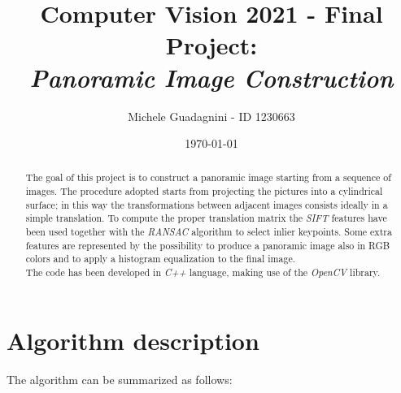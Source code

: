 \documentclass[11pt,a4paper]{article}
\author{Michele Guadagnini - ID 1230663}
\title{\textbf{Computer Vision 2021 - Final Project: \\ \textit{Panoramic Image Construction}}}
\date{\today}
\begin{document}
\maketitle

\vspace{20pt}
\begin{abstract}
	The goal of this project is to construct a panoramic image starting from a sequence of images. 
	The procedure adopted starts from projecting the pictures into a cylindrical surface; in this way the transformations between adjacent images consists ideally in a simple translation.
	To compute the proper translation matrix the \textit{SIFT} features have been used together with the \textit{RANSAC} algorithm to select inlier keypoints.
	Some extra features are represented by the possibility to produce a panoramic image also in RGB colors and to apply a histogram equalization to the final image. \\
	The code has been developed in \textit{C++} language, making use of the \textit{OpenCV} library.
\end{abstract}

\section{Algorithm description} %

The algorithm can be summarized as follows:
\end{document}
